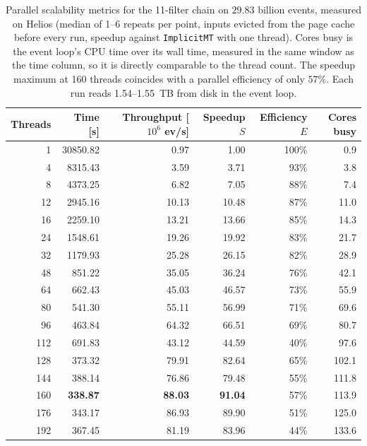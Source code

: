 \begin{table}[htbp]
\centering
\caption{Parallel scalability metrics for the 11-filter chain on $29.83$ billion events, measured on Helios (median of 1--6 repeats per point, inputs evicted from the page cache before every run, speedup against \texttt{ImplicitMT} with one thread). Cores busy is the event loop's CPU time over its wall time, measured in the same window as the time column, so it is directly comparable to the thread count. The speedup maximum at 160 threads coincides with a parallel efficiency of only $57\%$. Each run reads 1.54--1.55~TB from disk in the event loop.}
\label{tab:scalability-chain11}
\begin{tabular}{rrrrrr}
\toprule
Threads & Time [s] & Throughput [$10^6$ ev/s] & Speedup $S$ & Efficiency $E$ & Cores busy \\
\midrule
 1 & 30850.82 & 0.97 & 1.00 & 100\% & 0.9 \\
 4 & 8315.43 & 3.59 & 3.71 & 93\% & 3.8 \\
 8 & 4373.25 & 6.82 & 7.05 & 88\% & 7.4 \\
12 & 2945.16 & 10.13 & 10.48 & 87\% & 11.0 \\
16 & 2259.10 & 13.21 & 13.66 & 85\% & 14.3 \\
24 & 1548.61 & 19.26 & 19.92 & 83\% & 21.7 \\
32 & 1179.93 & 25.28 & 26.15 & 82\% & 28.9 \\
48 & 851.22 & 35.05 & 36.24 & 76\% & 42.1 \\
64 & 662.43 & 45.03 & 46.57 & 73\% & 55.9 \\
80 & 541.30 & 55.11 & 56.99 & 71\% & 69.6 \\
96 & 463.84 & 64.32 & 66.51 & 69\% & 80.7 \\
112 & 691.83 & 43.12 & 44.59 & 40\% & 97.6 \\
128 & 373.32 & 79.91 & 82.64 & 65\% & 102.1 \\
144 & 388.14 & 76.86 & 79.48 & 55\% & 111.8 \\
160 & \textbf{338.87} & \textbf{88.03} & \textbf{91.04} & 57\% & 113.9 \\
176 & 343.17 & 86.93 & 89.90 & 51\% & 125.0 \\
192 & 367.45 & 81.19 & 83.96 & 44\% & 133.6 \\
\bottomrule
\end{tabular}
\end{table}
